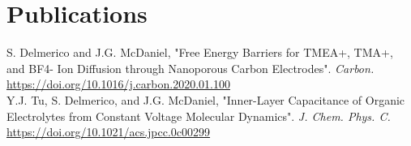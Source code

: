 \documentclass[fontsize=11pt]{tccv}
\begin{document}
\section{Publications}
\begin{hangparas}{0.25in}{1}
    S. Delmerico and J.G. McDaniel, "Free Energy Barriers for TMEA+, TMA+, and BF4- Ion Diffusion through Nanoporous Carbon Electrodes". \emph{Carbon.}
    \hyperlink{https://doi.org/10.1016/j.carbon.2020.01.100}{https://doi.org/10.1016/j.carbon.2020.01.100}
    \\
    
    Y.J. Tu, S. Delmerico, and J.G. McDaniel, "Inner-Layer Capacitance of Organic Electrolytes from Constant Voltage Molecular Dynamics". \emph{J. Chem. Phys. C.}
    \hyperlink{https://doi.org/10.1021/acs.jpcc.0c00299}{https://doi.org/10.1021/acs.jpcc.0c00299}
\end{hangparas}
\end{document}
